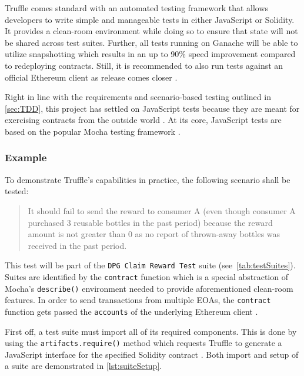 Truffle comes standard with an automated testing framework that allows developers to write simple and manageable tests in either JavaScript or Solidity. It provides a clean-room environment while doing so to ensure that state will not be shared across test suites. Further, all tests running on Ganache will be able to utilize snapshotting which results in an up to 90\% speed improvement compared to redeploying contracts. Still, it is recommended to also run tests against an official Ethereum client as release comes closer \cite[Testing Your Contracts]{truffleSuite}. 

Right in line with the requirements and scenario-based testing outlined in \autoref{sec:TDD}, this project has settled on JavaScript tests because they are meant for exercising contracts from the outside world \cite[Testing Your Contracts]{truffleSuite}. At its core, JavaScript tests are based on the popular Mocha testing framework \cite[Writing Tests in JavaScript]{truffleSuite}. 

\subsubsection{Example}
To demonstrate Truffle's capabilities in practice, the following scenario shall be tested:

\begin{quotation}
It should fail to send the reward to consumer A (even though consumer A purchased 3 reusable bottles in the past period) because the reward amount is not greater than 0 as no report of thrown-away bottles was received in the past period.
\end{quotation}

This test will be part of the \texttt{DPG Claim Reward Test} suite (see~\autoref{tab:testSuites}). Suites are identified by the \texttt{contract} function which is a special abstraction of Mocha's \texttt{describe()} environment needed to provide aforementioned clean-room features. In order to send transactions from multiple \acp{EOA}, the \texttt{contract} function gets passed the \texttt{accounts} of the underlying Ethereum client \cite[Writing Tests in JavaScript]{truffleSuite}.

First off, a test suite must import all of its required components. This is done by using the \texttt{artifacts.require()} method which requests Truffle to generate a JavaScript interface for the specified Solidity contract \cite[Writing Tests in JavaScript]{truffleSuite}. Both import and setup of a suite are demonstrated in \autoref{lst:suiteSetup}.

